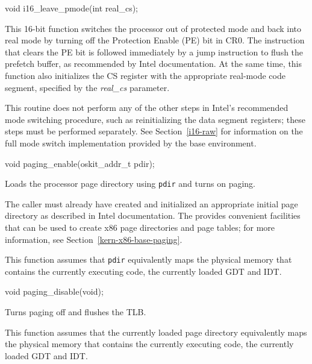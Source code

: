 \begin{apisyn}

	\funcproto void i16_leave_pmode(int real_cs);
\end{apisyn}
\begin{apidesc}
	This 16-bit function switches the processor out of protected mode
	and back into real mode
	by turning off the Protection Enable (PE) bit in CR0.
	The instruction that clears the PE bit
	is followed immediately by a jump instruction
	to flush the prefetch buffer,
	as recommended by Intel documentation.
	At the same time,
	this function also initializes the CS register
	with the appropriate real-mode code segment,
	specified by the \emph{real_cs} parameter.

	This routine does not perform any of the other steps
	in Intel's recommended mode switching procedure,
	such as reinitializing the data segment registers;
	these steps must be performed separately.
	See Section~\ref{i16-raw} for information on
	the full mode switch implementation
	provided by the base environment.
\end{apidesc}

\label{paging-enable}
\begin{apisyn}

	\funcproto void paging_enable(oskit_addr_t pdir);
\end{apisyn}
\begin{apidesc}
	Loads the processor page directory using {\tt pdir} and
	turns on paging.

	The caller must already have created and initialized
	an appropriate initial page directory
	as described in Intel documentation.
	The \oskit{} provides convenient facilities
	that can be used to create x86 page directories and page tables;
	for more information, see Section~\ref{kern-x86-base-paging}.

	This function assumes that {\tt pdir} equivalently maps
	the physical memory that contains the currently executing code,
	the currently loaded GDT and IDT.
\end{apidesc}

\label{paging-disable}
\begin{apisyn}

	\funcproto void paging_disable(void);
\end{apisyn}
\begin{apidesc}
	Turns paging off and flushes the TLB.

	This function assumes that the currently loaded page directory
	equivalently maps the physical memory that contains
	the currently executing code, the currently loaded GDT and IDT.
\end{apidesc}


